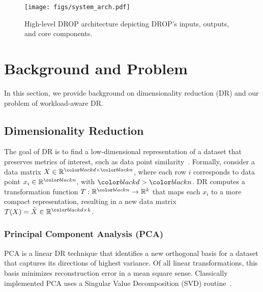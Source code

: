 \begin{figure*}
\begin{center}
\texttt{[image: figs/system\_arch.pdf]}\vspace{-1em}
\caption[]{High-level DROP architecture depicting DROP's inputs, outputs, and core components.}
\end{center}
\vspace{-1em}
\label{fig:arch}
\end{figure*}

\section{Background and Problem}
\label{sec:background}

In this section, we provide background on dimensionality reduction (DR) and our problem of workload-aware DR.

\subsection{Dimensionality Reduction}
\label{sec:defs}

The goal of DR is to find a low-dimensional representation of a dataset that preserves metrics of interest, such as data point similarity~\cite{dr-survey1,dr-survey2}. Formally, consider a data matrix $X \in \mathbb{R}^{\mvar \times \dvar}$, where each row $i$ corresponds to data point $x_i \in \mathbb{R}^\dvar$, with $\mvar > \dvar$.  
DR computes a transformation function $T: \mathbb{R}^\dvar \rightarrow \mathbb{R}^k$ that maps each $x_i$ to a more compact representation, resulting in a new data matrix $T(X) = \tilde{X} \in \mathbb{R}^{\mvar \times k}$.

\subsubsection*{Principal Component Analysis (PCA)}
\label{sec:pca}
PCA is a linear DR technique that identifies a new orthogonal basis for a dataset that captures its directions of highest variance.
Of all linear transformations, this basis minimizes reconstruction error in a mean square sense. 
Classically implemented PCA uses a Singular Value Decomposition (SVD) routine~\cite{trefethen}.



